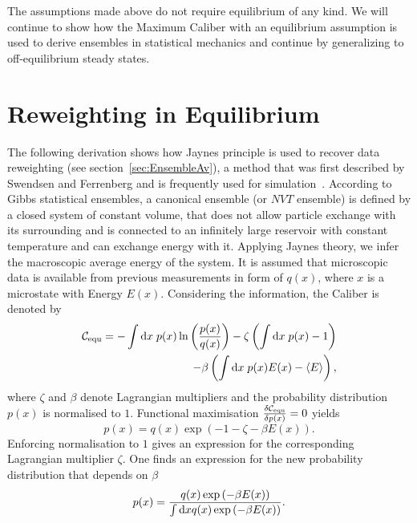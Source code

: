 The assumptions made above do not require equilibrium of any kind. We will continue 
to show how the Maximum Caliber with an equilibrium assumption is used to derive ensembles in statistical mechanics and continue by generalizing to off-equilibrium steady states. 

\section{Reweighting in Equilibrium}
 \label{sec:rewEqu}

The following derivation shows how Jaynes principle is used to recover data reweighting (see section~\ref{sec:EnsembleAv}), a method that was first described by Swendsen and Ferrenberg and is frequently used for simulation~\cite{ferrenberg1988new}. 
According to Gibbs statistical ensembles, a canonical ensemble (or $NVT$ ensemble) is defined by a closed system of constant volume, that does not allow particle exchange with its surrounding and is connected to an infinitely large reservoir with constant temperature and can exchange energy with it. Applying Jaynes theory, we infer the macroscopic average energy of the system. 
It is assumed that microscopic data is available from previous measurements in form of $q(x)$, where $x$ is a microstate with Energy $E(x)$. Considering the information, the Caliber is denoted by
\begin{equation}
\begin{aligned}
\mathcal{C_{\text{equ}}} = -\int \mathop{}\!\mathrm{d} x \; p(x) \ln \left ( \frac{p(x)}{q(x)} \right )  - \zeta \left ( \int \mathop{}\!\mathrm{d} x \; p(x) - 1 \right ) \\
- \beta \left( \int \mathop{}\!\mathrm{d} x \; p(x) E(x) - \langle E \rangle \right),
\end{aligned}
\label{eq:Caliber1}
\end{equation}
where $\zeta$ and $\beta$ denote Lagrangian multipliers and the probability distribution $p(x)$ is normalised to $1$.  Functional maximisation $\fdv{\mathcal{C_{\text{equ}}} }{p(x)} = 0$ yields 
\begin{equation}
 p(x) = q(x) \exp \left ( -1 - \zeta -\beta E(x) \right ).
\end{equation}
Enforcing normalisation to $1$ gives an expression for the corresponding Lagrangian multiplier $\zeta$. One finds an expression for the new probability distribution that depends on $\beta$
\begin{equation}
    p(x) =  \frac{q(x) \exp \left ( -\beta E(x) \right )}
    {\int \mathop{}\!\mathrm{d} x q(x) \exp \left( -\beta E(x) \right ) }. 
\label{eq:RewEqu}
\end{equation}
